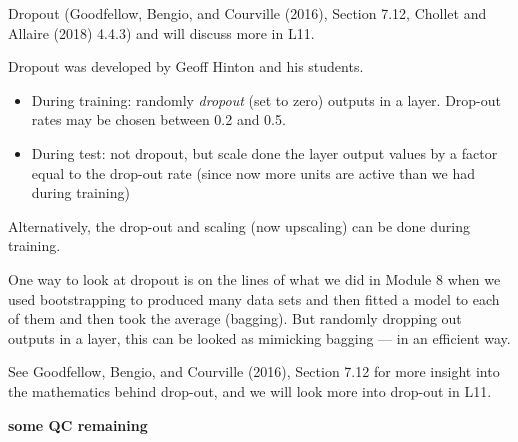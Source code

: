 \documentclass[
  ignorenonframetext,
]{beamer}
\providecommand{\tightlist}{%
  \setlength{\itemsep}{0pt}\setlength{\parskip}{0pt}}
\begin{document}
\begin{frame}
\begin{block}{Dropout}
\protect\hypertarget{dropout}{}
(Goodfellow, Bengio, and Courville (2016), Section 7.12, Chollet and
Allaire (2018) 4.4.3) and will discuss more in L11.

Dropout was developed by Geoff Hinton and his students.

\begin{itemize}
\tightlist
\item
  During training: randomly \emph{dropout} (set to zero) outputs in a
  layer. Drop-out rates may be chosen between 0.2 and 0.5.
\item
  During test: not dropout, but scale done the layer output values by a
  factor equal to the drop-out rate (since now more units are active
  than we had during training)
\end{itemize}

Alternatively, the drop-out and scaling (now upscaling) can be done
during training.
\end{block}
\end{frame}

\begin{frame}
One way to look at dropout is on the lines of what we did in Module 8
when we used bootstrapping to produced many data sets and then fitted a
model to each of them and then took the average (bagging). But randomly
dropping out outputs in a layer, this can be looked as mimicking bagging
--- in an efficient way.

See Goodfellow, Bengio, and Courville (2016), Section 7.12 for more
insight into the mathematics behind drop-out, and we will look more into
drop-out in L11.

\textbf{some QC remaining}
\end{frame}
\end{document}
